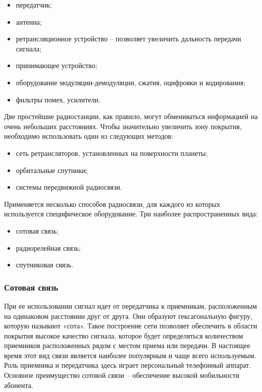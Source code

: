 \documentclass[a4paper]{report}
\begin{document}
\begin{itemize}
\item передатчик;
\item антенна;
\item ретрансляционное устройство – позволяет увеличить дальность передачи сигнала;
\item принимающее устройство;
\item оборудование модуляции-демодуляции, сжатия, оцифровки и кодирования;
\item фильтры помех, усилители.
\end{itemize}

Две простейшие радиостанции, как правило, могут обмениваться информацией на очень небольших расстояниях. Чтобы значительно увеличить зону покрытия, необходимо использовать один из следующих методов:

\begin{itemize}
\item сеть ретрансляторов, установленных на поверхности планеты;
\item орбитальные спутники;
\item системы передвижной радиосвязи.
\end{itemize}

Применяется несколько способов радиосвязи, для каждого из которых используется специфическое оборудование. Три наиболее распространенных вида:
\begin{itemize}
\item сотовая связь;
\item радиорелейная связь;
\item спутниковая связь.
\end{itemize}

\subsubsection{Сотовая связь}

При ее использовании сигнал идет от передатчика к приемникам, расположенным на одинаковом расстоянии друг от друга. Они образуют гексагональную фигуру, которую называют «сота». Такое построение сети позволяет обеспечить в области покрытия высокое качество сигнала, которое будет определяться количеством приемников расположенных рядом с местом приема или передачи. В настоящее время этот вид связи является наиболее популярным и чаще всего используемым. Роль приемника и передатчика здесь играет персональный телефонный аппарат. Основное преимущество сотовой связи – обеспечение высокой мобильности абонента.
\end{document}

